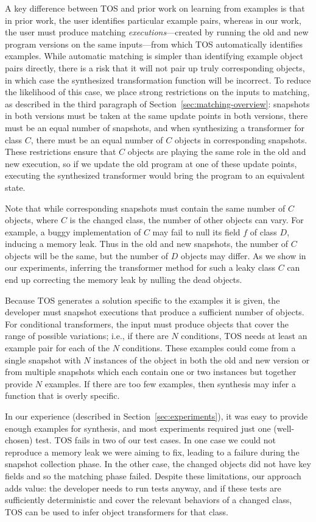 \documentclass[natbib,10pt]{sigplanconf}
\newcommand{\TOS}{TOS\xspace}
\begin{document}
A key difference between \TOS and prior work on learning from examples
is that in prior work, the user identifies particular example pairs,
whereas in our work, the user must produce matching
\emph{executions}---created by running the old and new program
versions on the same inputs---from which \TOS automatically identifies
examples.  While automatic matching is simpler than
identifying example object pairs directly, there is a risk that it
will not pair up truly corresponding objects, in which case the
synthesized transformation function will be incorrect.  To reduce the
likelihood of this case, we place strong restrictions on the
inputs to matching, as described in the third paragraph of
Section~\ref{sec:matching-overview}: snapshots in both versions must
be taken at the same update points in both versions, there
must be an equal number of snapshots, and when synthesizing a
transformer for class $C$, there must be an equal number of $C$
objects in corresponding snapshots.  These restrictions ensure that
$C$ objects are playing the same role in the old and new execution, so
if we update the old program at one of these update points,
executing the synthesized transformer would bring the program to an
equivalent state.

Note that while corresponding snapshots must contain the same number
of $C$ objects, where $C$ is the changed class, the number of other objects can vary.  For
example, a buggy implementation of $C$ may fail to null its field $f$
of class $D$, inducing a memory leak.  Thus in the old and new
snapshots, the number of $C$ objects will be the same, but the number
of $D$ objects may differ.  As we show in our experiments, inferring
the transformer method for such a leaky class $C$ can end up
correcting the memory leak by nulling the dead objects.

Because \TOS generates a solution specific to the examples it is
given, the developer must snapshot executions that produce a
sufficient number of objects.  For conditional transformers, the input
must produce objects that cover the range of possible variations;
i.e., if there are $N$ conditions, \TOS needs at least an example pair for each
of the $N$ conditions.  These examples could come from a single snapshot with
$N$ instances of the object in both the old and new version or from
multiple snapshots which each contain one or two instances but
together provide $N$ examples.  If there are too few examples, then
synthesis may infer a function that is overly specific.

In our experience (described in
Section~\ref{sec:experiments}), it was easy to provide enough examples for
synthesis,
and most experiments required just one (well-chosen) test.  \TOS fails
in two of our test cases.  In one case we could not reproduce
a memory leak we were aiming to fix, leading to a failure during the
snapshot collection phase.  In the other case, the changed
objects did not have key fields and so the matching phase failed.  Despite these
limitations, our approach adds
value: the developer needs to run tests anyway, and if these tests are
sufficiently deterministic and cover the relevant behaviors of a
changed class, \TOS can be used to infer object transformers for that
class.
\end{document}
